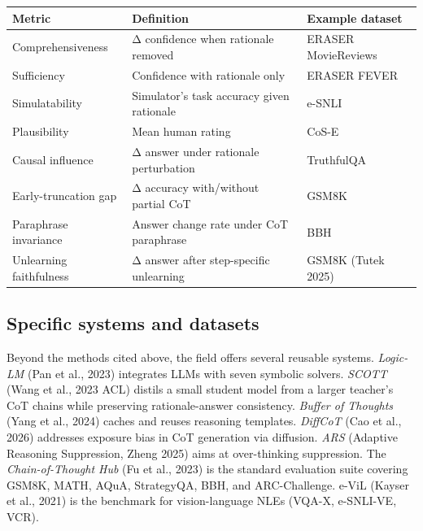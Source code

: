 {\def\LTcaptype{none} %
\begin{longtable}[]{@{}
  >{\raggedright\arraybackslash}p{}
  >{\raggedright\arraybackslash}p{}
  >{\raggedright\arraybackslash}p{}@{}}
\toprule\noalign{}
\begin{minipage}[b]{\linewidth}\raggedright
Metric
\end{minipage} & \begin{minipage}[b]{\linewidth}\raggedright
Definition
\end{minipage} & \begin{minipage}[b]{\linewidth}\raggedright
Example dataset
\end{minipage} \\
\midrule\noalign{}
\endhead
\bottomrule\noalign{}
\endlastfoot
Comprehensiveness & Δ confidence when rationale removed & ERASER MovieReviews \\
Sufficiency & Confidence with rationale only & ERASER FEVER \\
Simulatability & Simulator's task accuracy given rationale & e-SNLI \\
Plausibility & Mean human rating & CoS-E \\
Causal influence & Δ answer under rationale perturbation & TruthfulQA \\
Early-truncation gap & Δ accuracy with/without partial CoT & GSM8K \\
Paraphrase invariance & Answer change rate under CoT paraphrase & BBH \\
Unlearning faithfulness & Δ answer after step-specific unlearning & GSM8K (Tutek 2025) \\
\end{longtable}
}

\subsection{Specific systems and datasets}\label{specific-systems-and-datasets}

Beyond the methods cited above, the field offers several reusable systems. \emph{Logic-LM} (Pan et al., 2023) integrates LLMs with seven symbolic solvers. \emph{SCOTT} (Wang et al., 2023 ACL) distils a small student model from a larger teacher's CoT chains while preserving rationale-answer consistency. \emph{Buffer of Thoughts} (Yang et al., 2024) caches and reuses reasoning templates. \emph{DiffCoT} (Cao et al., 2026) addresses exposure bias in CoT generation via diffusion. \emph{ARS} (Adaptive Reasoning Suppression, Zheng 2025) aims at over-thinking suppression. The \emph{Chain-of-Thought Hub} (Fu et al., 2023) is the standard evaluation suite covering GSM8K, MATH, AQuA, StrategyQA, BBH, and ARC-Challenge. e-ViL (Kayser et al., 2021) is the benchmark for vision-language NLEs (VQA-X, e-SNLI-VE, VCR).

